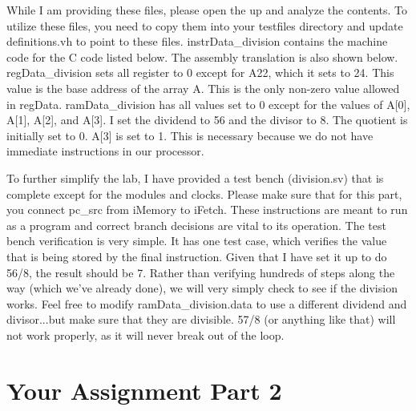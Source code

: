While I am providing these files, please open the up and analyze the contents.  To utilize these files, you need to copy them into your testfiles directory and update definitions.vh to point to these files.  instrData\_division contains the machine code for the C code listed below.  The assembly translation is also shown below.  regData\_division sets all register to 0 except for A22, which it sets to 24.  This value is the base address of the array A.  This is the only non-zero value allowed in regData.  ramData\_division has all values set to 0 except for the values of A[0], A[1], A[2], and A[3].  I set the dividend to 56 and the divisor to 8.  The quotient is initially set to 0.  A[3] is set to 1.  This is necessary because we do not have immediate instructions in our processor.

To further simplify the lab, I have provided a test bench (division.sv) that is complete except for the modules and clocks.  Please make sure that for this part, you connect pc\_src from iMemory to iFetch.  These instructions are meant to run as a program and correct branch decisions are vital to its operation.  The test bench verification is very simple.  It has one test case, which verifies the value that is being stored by the final instruction.  Given that I have set it up to do 56/8, the result should be 7.  Rather than verifying hundreds of steps along the way (which we've already done), we will very simply check to see if the division works.  Feel free to modify ramData\_division.data to use a different dividend and divisor...but make sure that they are divisible.  57/8 (or anything like that) will not work properly, as it will never break out of the loop.



\section{Your Assignment Part 2}


